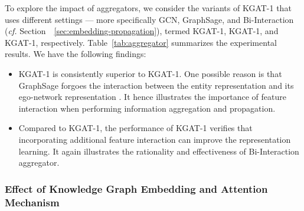 \documentclass[sigconf]{acmart}
\newcommand{\cf}{\emph{cf. }}
\theoremstyle{definition}
\begin{document}
To explore the impact of aggregators, we consider the variants of KGAT-1 that uses different settings --- more specifically GCN, GraphSage, and Bi-Interaction (\cf Section~~\ref{sec:embedding-propagation}), termed KGAT-1, KGAT-1, and KGAT-1, respectively.
Table~\ref{tab:aggregator} summarizes the experimental results.
We have the following findings:
\begin{itemize}[leftmargin=*]
    \item KGAT-1 is consistently superior to KGAT-1. One possible reason is that GraphSage forgoes the interaction between the entity representation  and its ego-network representation . It hence illustrates the importance of feature interaction when performing information aggregation and propagation.
    
    \item Compared to KGAT-1, the performance of KGAT-1 verifies that incorporating additional feature interaction can improve the representation learning. It again illustrates the rationality and effectiveness of Bi-Interaction aggregator.
\end{itemize}


\subsubsection{\textbf{Effect of Knowledge Graph Embedding and Attention Mechanism}}\label{sec:ablation-study}




\begin{table}[t]
\caption{Effect of aggregators.}
\vspace{-10px}
\label{tab:aggregator}
\vspace{-10px}
\end{table}
\end{document}
